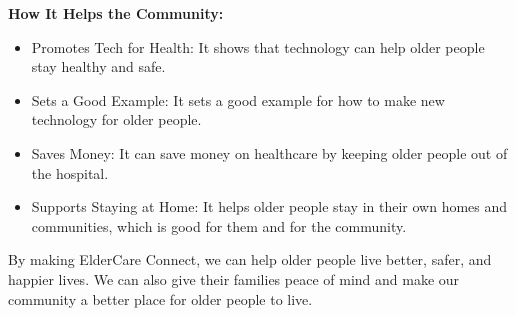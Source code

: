 \textbf{How It Helps the Community:}
\begin{itemize}
    \item Promotes Tech for Health: It shows that technology can help older people stay healthy and safe.
    \item Sets a Good Example: It sets a good example for how to make new technology for older people.
    \item Saves Money: It can save money on healthcare by keeping older people out of the hospital.
    \item Supports Staying at Home: It helps older people stay in their own homes and communities, which is good for them and for the community.
\end{itemize}
By making ElderCare Connect, we can help older people live better, safer, and happier lives. We can also give their families peace of mind and make our community a better place for older people to live.